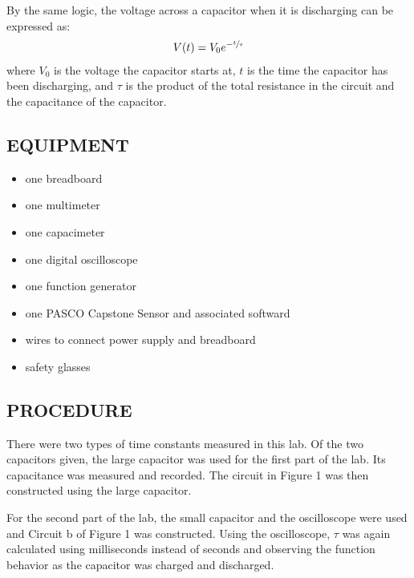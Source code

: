 \documentclass [12pt, letterpaper, twoside] {article}
\begin{document}
\noindent
By the same logic, the voltage across a capacitor when it is discharging can be expressed as:
\begin{equation}
  \begin{split}
    V(t) &= V_{0}e^{-\sfrac{t}{\tau}} \\
  \end{split}
\end{equation}
where \(V_{0}\) is the voltage the capacitor starts at, \(t\) is the time the capacitor has been discharging, and \(\tau\) is the product of the total resistance in the circuit and the capacitance of the capacitor.

\subsection* {EQUIPMENT}
  \noindent
  \begin {itemize}
    \itemsep0em
    \item {one breadboard}
    \item {one multimeter}
    \item {one capacimeter}
    \item {one digital oscilloscope}
    \item {one function generator}
    \item {one PASCO Capstone Sensor and associated softward}
    \item {wires to connect power supply and breadboard}
    \item {safety glasses}
  \end {itemize}

\subsection* {PROCEDURE}
There were two types of time constants measured in this lab. Of the two capacitors given, the large capacitor was used for the first part of the lab. Its capacitance was measured and recorded. The circuit in Figure 1 was then constructed using the large capacitor.

\noindent
For the second part of the lab, the small capacitor and the oscilloscope were used and Circuit b of Figure 1 was constructed. Using the oscilloscope, \(\tau\) was again calculated using milliseconds instead of seconds and observing the function behavior as the capacitor was charged and discharged.
\end{document}
